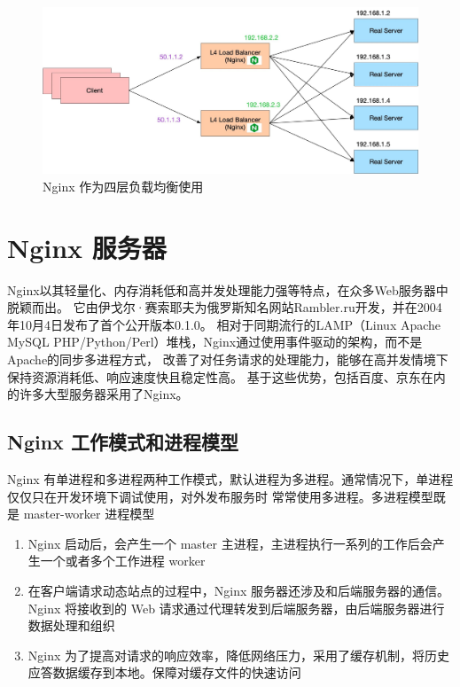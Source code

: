 \begin{figure}[htb]
	\centering
	\includegraphics[width=\textwidth]{figures/nginx-l4lb-2048x911.jpg}
	\caption{Nginx 作为四层负载均衡使用}
	\label{four_land_balance}
\end{figure}

\section{Nginx 服务器}

Nginx以其轻量化、内存消耗低和高并发处理能力强等特点，在众多Web服务器中脱颖而出。
它由伊戈尔·赛索耶夫为俄罗斯知名网站Rambler.ru开发，并在2004年10月4日发布了首个公开版本0.1.0。
相对于同期流行的LAMP（Linux Apache MySQL PHP/Python/Perl）堆栈，Nginx通过使用事件驱动的架构，而不是Apache的同步多进程方式，
改善了对任务请求的处理能力，能够在高并发情境下保持资源消耗低、响应速度快且稳定性高\cite{凌质亿2013高并发环境下}。
基于这些优势，包括百度、京东在内的许多大型服务器采用了Nginx。

\subsection{Nginx 工作模式和进程模型}

Nginx 有单进程和多进程两种工作模式，默认进程为多进程。通常情况下，单进程仅仅只在开发环境下调试使用，对外发布服务时
常常使用多进程。多进程模型既是 master-worker 进程模型

\noindent\begin{enumerate}
	\item Nginx 启动后，会产生一个 master 主进程，主进程执行一系列的工作后会产生一个或者多个工作进程 worker
	\item 在客户端请求动态站点的过程中，Nginx 服务器还涉及和后端服务器的通信。Nginx 将接收到的 Web 请求通过代理转发到后端服务器，由后端服务器进行数据处理和组织
	\item Nginx 为了提高对请求的响应效率，降低网络压力，采用了缓存机制，将历史应答数据缓存到本地。保障对缓存文件的快速访问
\end{enumerate}

